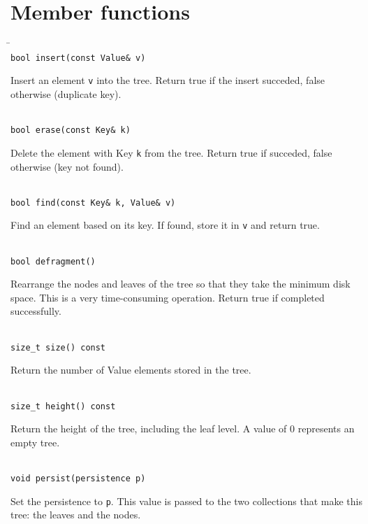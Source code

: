 \documentclass[11pt]{article}
\begin{document}
\section{Member functions}
   \begin{tabbing}
   \hspace*{.3in} \= \hspace{.5in} \= \\ 

   \> {\tt bool insert(const Value\& v)}\\ 
   \>\>\parbox[t]{5.5in}{Insert an element {\tt v} into the tree. Return true if the insert succeded, false otherwise (duplicate key).}\\[3mm]

   \> {\tt bool erase(const Key\& k)}\\ 
   \>\>\parbox[t]{5.5in}{Delete the element with Key {\tt k} from the tree. Return true if succeded, false otherwise (key not found).}\\[3mm]

   \> {\tt bool find(const Key\& k, Value\& v)}\\ 
   \>\>\parbox[t]{5.5in}{Find an element based on its key. If found, store it in {\tt v} and return true.}\\[3mm]

   \> {\tt bool defragment()}\\ 
   \>\>\parbox[t]{5.5in}{Rearrange the nodes and leaves of the tree so that they take the minimum disk space. This is a very time-consuming operation. Return true if completed successfully.}\\[3mm]


   \> {\tt size\_t size() const }\\ 
   \>\>\parbox[t]{5.5in}{Return the number of Value elements stored in the tree.}\\[3mm]

   \> {\tt size\_t height() const }\\ 
   \>\>\parbox[t]{5.5in}{Return the height of the tree, including the leaf level. A value of $0$ represents an empty tree.}\\[3mm]

   \> {\tt void persist(persistence p) }\\ 
   \>\>\parbox[t]{5.5in}{Set the persistence to {\tt p}. This value is passed to the two collections that make this tree: the leaves and the nodes.}\\[3mm]

\end{tabbing}
\end{document}
